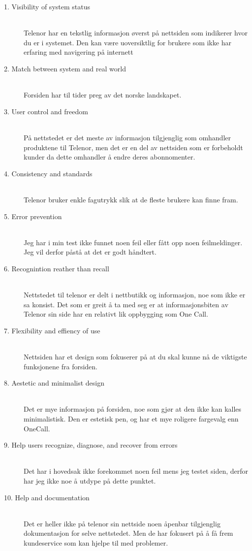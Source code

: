\documentclass[a4paper, 10pt]{article}
\begin{document}
\begin{description}
  \item[1. Visibility of system status] \hfill \\
    Telenor har en tekstlig informasjon øverst på nettsiden som indikerer hvor du er i systemet. Den kan være uoversiktlig for brukere som ikke har erfaring med navigering på internett
  \item[2. Match between system and real world] \hfill \\
    Forsiden har til tider preg av det norske landskapet.
  \item[3. User control and freedom] \hfill \\
    På nettstedet er det meste av informasjon tilgjenglig som omhandler produktene til Telenor, men det er en del av nettsiden som er forbeholdt kunder da dette omhandler å endre deres abonnomenter.
  \item[4. Consistency and standards] \hfill \\
    Telenor bruker enkle fagutrykk slik at de fleste brukere kan finne fram.
  \item[5. Error prevention] \hfill \\
    Jeg har i min test ikke funnet noen feil eller fått opp noen feilmeldinger. Jeg vil derfor påstå at det er godt håndtert.
  \item[6. Recognintion reather than recall] \hfill \\
    Nettstedet til telenor er delt i nettbutikk og informasjon, noe som ikke er sa konsist. Det som er greit å ta med seg er at informasjonsbiten av Telenor sin side har en relativt lik oppbygging som One Call.
  \item[7. Flexibility and effiency of use] \hfill \\
    Nettsiden har et design som fokuserer på at du skal kunne nå de viktigste funksjonene fra forsiden.
  \item[8. Aestetic and minimalist design] \hfill \\
    Det er mye informasjon på forsiden, noe som gjør at den ikke kan kalles minimalistisk. Den er estetisk pen, og har et mye roligere fargevalg enn OneCall.
  \item[9. Help users recognize, diagnose, and recover from errors] \hfill \\
    Det har i hovedsak ikke forekommet noen feil mens jeg testet siden, derfor har jeg ikke noe å utdype på dette punktet.
  \item[10. Help and documentation] \hfill \\
    Det er heller ikke på telenor sin nettside noen åpenbar tilgjenglig dokumentasjon for selve nettstedet. Men de har fokusert på å få frem kundeservice som kan hjelpe til med problemer.
\end{description}
\end{document}
